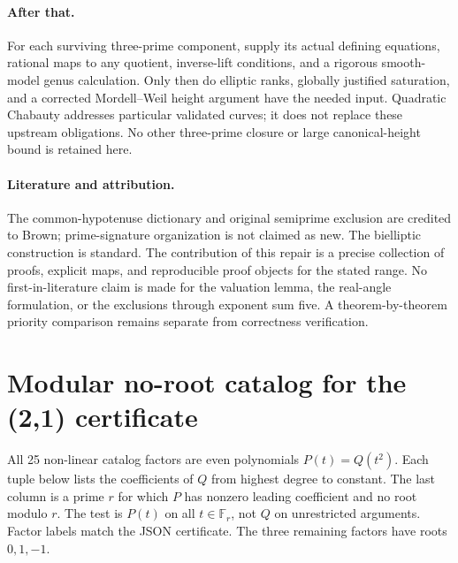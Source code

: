 \documentclass[11pt]{article}
\theoremstyle{definition}\newtheorem{definition}[theorem]{Definition}
\theoremstyle{remark}\newtheorem{remark}[theorem]{Remark}
\begin{document}
\paragraph{After that.}
For each surviving three-prime component, supply its actual defining equations, rational maps to any quotient, inverse-lift conditions, and a rigorous smooth-model genus calculation. Only then do elliptic ranks, globally justified saturation, and a corrected Mordell--Weil height argument have the needed input. Quadratic Chabauty addresses particular validated curves; it does not replace these upstream obligations. No other three-prime closure or large canonical-height bound is retained here.

\paragraph{Literature and attribution.}
The common-hypotenuse dictionary and original semiprime exclusion are credited to Brown; prime-signature organization is not claimed as new. The bielliptic construction is standard. The contribution of this repair is a precise collection of proofs, explicit maps, and reproducible proof objects for the stated range. No first-in-literature claim is made for the valuation lemma, the real-angle formulation, or the exclusions through exponent sum five. A theorem-by-theorem priority comparison remains separate from correctness verification.

\appendix
\section{Modular no-root catalog for the (2,1) certificate}\label{app:factors}
All 25 non-linear catalog factors are even polynomials $P(t)=Q(t^2)$. Each tuple below lists the coefficients of $Q$ from highest degree to constant. The last column is a prime $r$ for which $P$ has nonzero leading coefficient and no root modulo $r$. The test is $P(t)$ on all $t\in\mathbb F_r$, not $Q$ on unrestricted arguments. Factor labels match the JSON certificate. The three remaining factors have roots $0,1,-1$.
\end{document}
